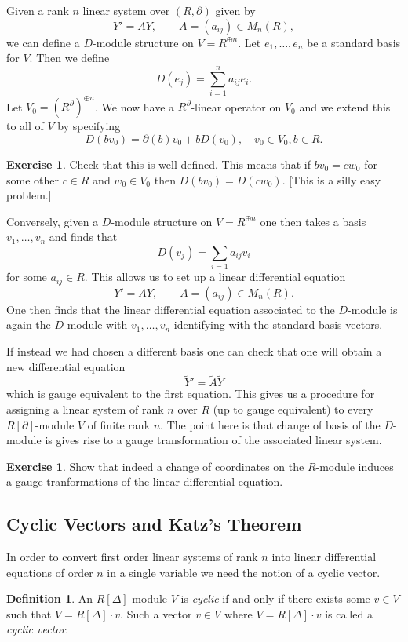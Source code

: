 \documentclass[12pt]{book}
\numberwithin{equation}{section}
\theoremstyle{definition}
\newtheorem{definition}[theorem]{Definition}
\newtheorem{exercise}[theorem]{Exercise}
\theoremstyle{remark}
\begin{document}
Given a rank $n$ linear system over $(R,\partial)$ given by 
$$ Y' = A Y, \qquad A = (a_{ij}) \in M_n(R), $$
we can define a $D$-module structure on $V=R^{\oplus n}$.
Let $e_1,\ldots,e_n$ be a standard basis for $V$.
Then we define 
$$ D(e_j) = \sum_{i=1}^n a_{ij} e_i.$$
Let $V_0 = (R^{\partial})^{\oplus n}$. 
We now have a $R^{\partial}$-linear operator on $V_0$ and we extend this to all of $V$ by specifying 
$$ D(b v_0) = \partial(b)v_0 + b D(v_0), \quad v_0 \in V_0, b \in R. $$
\begin{exercise}
	Check that this is well defined.
	This means that if $bv_0 = cw_0$ for some other $c \in R$ and $w_0 \in V_0$ then $D(bv_0) = D(cw_0)$. [This is a silly easy problem.]
\end{exercise}

Conversely, given a $D$-module structure on $V = R^{\oplus n}$ one then takes a basis $v_1,\ldots, v_n$ and finds that 
$$ D(v_j) = \sum_{i=1}a_{ij}v_i $$
for some $a_{ij}\in R$. 
This allows us to set up a linear differential equation 
$$ Y' = AY, \qquad A = (a_{ij}) \in M_n(R).$$
One then finds that the linear differential equation associated to the $D$-module is again the $D$-module with $v_1,\ldots,v_n$ identifying with the standard basis vectors. 

If instead we had chosen a different basis one can check that one will obtain a new differential equation
$$ \widetilde{Y}' = \widetilde{A} \widetilde{Y} $$
which is gauge equivalent to the first equation. 
This gives us a procedure for assigning a linear system of rank $n$ over $R$ (up to gauge equivalent) to every $R[\partial]$-module $V$ of finite rank $n$.
The point here is that change of basis of the $D$-module is gives rise to a gauge transformation of the associated linear system.

\begin{exercise}
	Show that indeed a change of coordinates on the $R$-module induces a gauge tranformations of the linear differential equation.
\end{exercise}

\subsection{Cyclic Vectors and Katz's Theorem}
In order to convert first order linear systems of rank $n$ into linear differential equations of  order $n$ in a single variable we need the notion of a cyclic vector. 
\begin{definition}
	An $R[\Delta]$-module $V$ is \emph{cyclic} if and only if there exists some $v \in V$ such that $V = R[\Delta]\cdot v$. 
	Such a vector $v \in V$ where $V = R[\Delta]\cdot v$ is called a \emph{cyclic vector}.
\end{definition}
\end{document}
